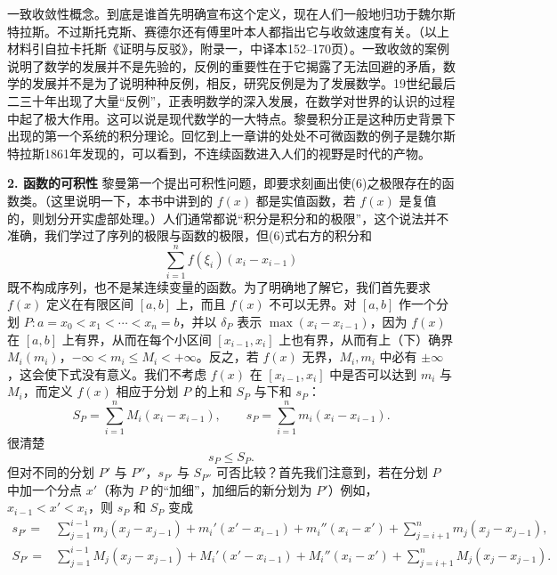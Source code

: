 一致收敛性概念。到底是谁首先明确宣布这个定义，现在人们一般地归功于魏尔斯特拉斯。不过斯托克斯、赛德尔还有傅里叶本人都指出它与收敛速度有关。（以上材料引自拉卡托斯《证明与反驳》，附录一，中译本152--170页）。一致收敛的案例说明了数学的发展并不是先验的，反例的重要性在于它揭露了无法回避的矛盾，数学的发展并不是为了说明种种反例，相反，研究反例是为了发展数学。19世纪最后二三十年出现了大量“反例”，正表明数学的深入发展，在数学对世界的认识的过程中起了极大作用。这可以说是现代数学的一大特点。黎曼积分正是这种历史背景下出现的第一个系统的积分理论。回忆到上一章讲的处处不可微函数的例子是魏尔斯特拉斯1861年发现的，可以看到，不连续函数进入人们的视野是时代的产物。

\noindent\textbf{2. 函数的可积性}\quad
黎曼第一个提出可积性问题，即要求刻画出使(6)之极限存在的函数类。（这里说明一下，本书中讲到的 $f(x)$ 都是实值函数，若 $f(x)$ 是复值的，则划分开实虚部处理。）人们通常都说“积分是积分和的极限”，这个说法并不准确，我们学过了序列的极限与函数的极限，但(6)式右方的积分和
\begin{equation}
 \sum_{i=1}^{n} f(\xi_i)(x_i-x_{i-1})
 \tag{7}
\end{equation}
既不构成序列，也不是某连续变量的函数。为了明确地了解它，我们首先要求 $f(x)$ 定义在有限区间 $[a,b]$ 上，而且 $f(x)$ 不可以无界。对 $[a,b]$ 作一个分划 $P:a=x_0<x_1<\cdots<x_n=b$，并以 $\delta_P$ 表示 $\max(x_i-x_{i-1})$，因为 $f(x)$ 在 $[a,b]$ 上有界，从而在每个小区间 $[x_{i-1},x_i]$ 上也有界，从而有上（下）确界 $M_i(m_i)$，$-\infty<m_i\le M_i<+\infty$。反之，若 $f(x)$ 无界，$M_i,m_i$ 中必有 $\pm\infty$，这会使下式没有意义。我们不考虑 $f(x)$ 在 $[x_{i-1},x_i]$ 中是否可以达到 $m_i$ 与 $M_i$，而定义 $f(x)$ 相应于分划 $P$ 的上和 $S_P$ 与下和 $s_P$：
\begin{equation}
 S_P=\sum_{i=1}^{n}M_i(x_i-x_{i-1}),\qquad
 s_P=\sum_{i=1}^{n}m_i(x_i-x_{i-1}).
 \tag{8}
\end{equation}
很清楚
\begin{equation}
 s_P\le S_P.
 \tag{9}
\end{equation}
但对不同的分划 $P'$ 与 $P''$，$s_{P'}$ 与 $S_{P''}$ 可否比较？首先我们注意到，若在分划 $P$ 中加一个分点 $x'$（称为 $P$ 的“加细”，加细后的新分划为 $P'$）例如，$x_{i-1}<x'<x_i$，则 $s_P$ 和 $S_P$ 变成
\begin{align*}
 s_{P'}={}&\sum_{j=1}^{i-1}m_j(x_j-x_{j-1})+m_i'(x'-x_{i-1})+m_i''(x_i-x')
 +\sum_{j=i+1}^{n}m_j(x_j-x_{j-1}),\\
 S_{P'}={}&\sum_{j=1}^{i-1}M_j(x_j-x_{j-1})+M_i'(x'-x_{i-1})+M_i''(x_i-x')
 +\sum_{j=i+1}^{n}M_j(x_j-x_{j-1}).
\end{align*}

